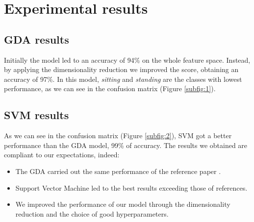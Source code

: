 \documentclass[a4paper,10pt,oneside]{article}
\begin{document}
\section{Experimental results}
\subsection{GDA results}
Initially the model led to an accuracy of 94\% on the whole feature space. Instead, by applying the dimensionality reduction we improved the score, obtaining an accuracy of 97\%.
In this model, \textit{sitting} and \textit{standing} are the classes with lowest performance, as we can see in the confusion matrix (Figure \ref{subfig:1}). 

\subsection{SVM results}
As we can see in the confusion matrix (Figure \ref{subfig:2}), SVM got a better performance than the GDA model, 99\% of accuracy.
The results we obtained are compliant to our expectations, indeed:
\begin{itemize}
 \item The GDA carried out the same performance of the reference paper \cite{brown2013activity}.
 \item Support Vector Machine led to the best results exceeding those of references.
 \item We improved the performance of our model through the dimensionality reduction and the choice of good hyperparameters.
\end{itemize}
\end{document}

